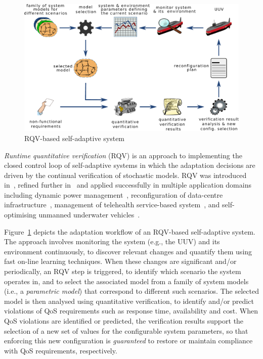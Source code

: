 
\begin{figure}
\centering
\includegraphics[width=0.75\hsize]{figures/rqv.pdf}
\caption{RQV-based self-adaptive system}
\label{fig:RQV}

\vspace*{-2mm}
\end{figure}

\textit{Runtime quantitative verification} (RQV) \cite{Calinescu2012:CACM} is an approach to implementing the closed control loop of self-adaptive systems in which the adaptation decisions are driven by the continual verification of stochastic models. RQV was introduced in~\cite{Calinescu2009:ICSE,Epifani2009:ICSE}, refined further in~\cite{Calinescu2011:TSE,Filieri2011:ICSE,Johnson2013:CBSE} and applied successfully in multiple application domains including dynamic power management~\cite{Calinescu2009:ICSE}, reconfiguration of data-centre infrastructure~\cite{Johnson2013:CBSE}, management of telehealth service-based system~\cite{Calinescu2011:TSE}, and self-optimising unmanned underwater vehicles~\cite{Gerasimou2014:SEAMS}.


Figure~\ref{fig:RQV} depicts the adaptation workflow of an RQV-based self-adaptive system. The approach involves monitoring the system (e.g., the UUV) and its environment continuously, to discover relevant changes and quantify them using fast on-line learning techniques. When these changes are significant and/or periodically, an RQV step is triggered, to identify which scenario the system operates in, and to select the associated model from a family of system models (i.e., a \emph{parametric model}) that correspond to different such scenarios. The selected model is then analysed using quantitative verification, to identify and/or predict violations of QoS requirements such as response time, availability and cost. When QoS violations are identified or predicted, the verification results support the selection of a new set of values for the configurable system parameters, so that enforcing this new configuration is \emph{guaranteed} to restore or maintain compliance with QoS requirements, respectively.

